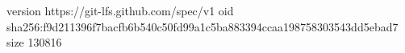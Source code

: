 version https://git-lfs.github.com/spec/v1
oid sha256:f9d211396f7bacfb6b540c50fd99a1c5ba883394ccaa198758303543dd5ebad7
size 130816

